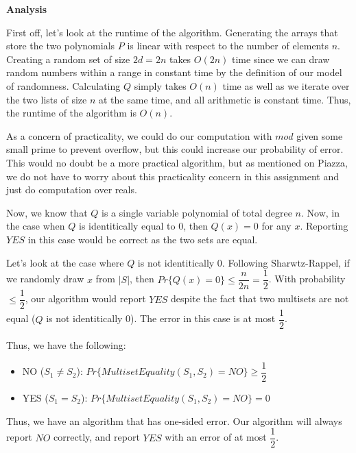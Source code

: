 \documentclass{article}
\begin{document}
\textbf{Analysis}

First off, let's look at the runtime of the algorithm. Generating the arrays that store the two polynomials $P$ is
linear with respect to the number of elements $n$. Creating a random set of size $2d = 2n$ takes $O(2n)$ time since we
can draw random numbers within a range in constant time by the definition of our model of randomness. Calculating $Q$
simply takes $O(n)$ time as well as we iterate over the two lists of size $n$ at the same time, and all arithmetic is
constant time. Thus, the runtime of the algorithm is $O(n)$.

As a concern of practicality, we could do our computation with $mod$ given some small prime to prevent overflow, but
this could increase our probability of error. This would no doubt be a more practical algorithm, but as mentioned on
Piazza, we do not have to worry about this practicality concern in this assignment and just do computation over reals.

Now, we know that $Q$ is a single variable polynomial of total degree $n$. Now, in the case when $Q$ is identitically
equal to 0, then $Q(x) = 0$ for any $x$. Reporting $YES$ in this case would be correct as the two sets are equal.

Let's look at the case where $Q$ is not identitically 0. Following Sharwtz-Rappel, if we randomly draw $x$ from $|S|$,
then $Pr\{Q(x) = 0\} \leq \dfrac{n}{2n} = \dfrac{1}{2}$. With probability $\leq \dfrac{1}{2}$, our algorithm would
report $YES$ despite the fact that two multisets are not equal ($Q$ is not identitically 0). The error in this case is
at most $\dfrac{1}{2}$.

Thus, we have the following:
\begin{itemize}
    \item NO ($S_1 \neq S_2$): $Pr\{MultisetEquality(S_1, S_2) = NO\} \geq \dfrac{1}{2}$
    \item YES ($S_1 = S_2$): $Pr\{MultisetEquality(S_1, S_2) = NO\} = 0$
\end{itemize}

Thus, we have an algorithm that has one-sided error. Our algorithm will always report $NO$ correctly, and report $YES$
with an error of at most $\dfrac{1}{2}$.
\end{document}
